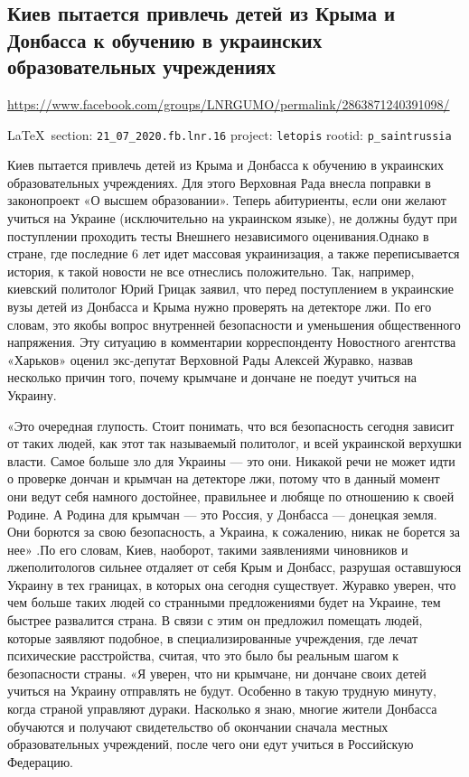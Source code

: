  
 
\subsection{Киев пытается привлечь детей из Крыма и Донбасса к обучению в украинских образовательных учреждениях}
\url{https://www.facebook.com/groups/LNRGUMO/permalink/2863871240391098/}
  
\vspace{0.5cm}
{\small\LaTeX~section: \verb|21_07_2020.fb.lnr.16| project: \verb|letopis| rootid: \verb|p_saintrussia|}
\vspace{0.5cm}
  
Киев пытается привлечь детей из Крыма и Донбасса к обучению в украинских
образовательных учреждениях. Для этого Верховная Рада внесла поправки в
законопроект «О высшем образовании». Теперь абитуриенты, если они желают
учиться на Украине (исключительно на украинском языке), не должны будут при
поступлении проходить тесты Внешнего независимого оценивания.Однако в стране,
где последние 6 лет идет массовая украинизация, а также переписывается история,
к такой новости не все отнеслись положительно. Так, например, киевский
политолог Юрий Грицак заявил, что перед поступлением в украинские вузы детей из
Донбасса и Крыма нужно проверять на детекторе лжи. По его словам, это якобы
вопрос внутренней безопасности и уменьшения общественного напряжения. Эту
ситуацию в комментарии корреспонденту Новостного агентства «Харьков» оценил
экс-депутат Верховной Рады Алексей Журавко, назвав несколько причин того,
почему крымчане и дончане не поедут учиться на Украину.

«Это очередная глупость. Стоит понимать, что вся безопасность сегодня зависит
от таких людей, как этот так называемый политолог, и всей украинской верхушки
власти. Самое больше зло для Украины --- это они.  Никакой речи не может идти о
проверке дончан и крымчан на детекторе лжи, потому что в данный момент они
ведут себя намного достойнее, правильнее и любяще по отношению к своей Родине.
А Родина для крымчан --- это Россия, у Донбасса --- донецкая земля. Они борются за
свою безопасность, а Украина, к сожалению, никак не борется за нее» .По его
словам, Киев, наоборот, такими заявлениями чиновников и лжеполитологов сильнее
отдаляет от себя Крым и Донбасс, разрушая оставшуюся Украину в тех границах, в
которых она сегодня существует. Журавко уверен, что чем больше таких людей со
странными предложениями будет на Украине, тем быстрее развалится страна. В
связи с этим он предложил помещать людей, которые заявляют подобное, в
специализированные учреждения, где лечат психические расстройства, считая, что
это было бы реальным шагом к безопасности страны.  «Я уверен, что ни крымчане,
ни дончане своих детей учиться на Украину отправлять не будут. Особенно в такую
трудную минуту, когда страной управляют дураки. Насколько я знаю, многие жители
Донбасса обучаются и получают свидетельство об окончании сначала местных
образовательных учреждений, после чего они едут учиться в Российскую Федерацию.

